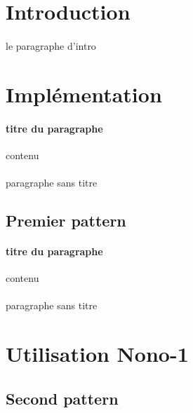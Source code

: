 \documentclass[a4paper]{article}
\title{\text{Quel bazar!}}
\author{Thomas \textsc{Minier}, Benjamin \textsc{Sientzoff}}
\date{\today}
\begin{document}
	\maketitle
	\vspace{5cm}
	\tableofcontents
	\newpage %
	
	\section*{Introduction}
	\paragraph{}{le paragraphe d'intro}
	
	\section{Implémentation}
	
		\paragraph{titre du paragraphe}{contenu}
		\paragraph{}{paragraphe sans titre}
		
		\subsection{Premier pattern}
		\paragraph{titre du paragraphe}{contenu}
		\paragraph{}{paragraphe sans titre}
		
	\section{Utilisation Nono-1}
		\subsection{Second pattern}
\end{document}
